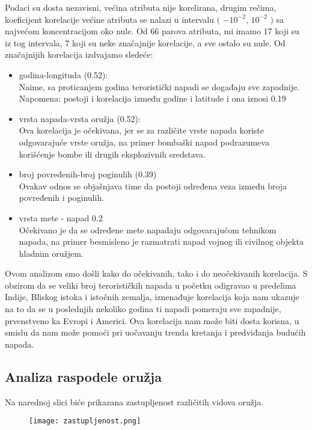 \documentclass[a4paper]{article}
\begin{document}
Podaci su dosta nezavisni, većina atributa nije korelirana, drugim rečima, koeficijent korelacije većine atributa se nalazi u intervalu $($ $-10^{-2}$, $10^{-2}$ $)$ sa najvećom koncentracijom oko nule. Od 66 parova atributa, mi imamo 17 koji su iz tog intervala, 7 koji su neke značajnije korelacije, a sve ostalo su nule. Od značajnijih korelacija izdvajamo sledeće: 
\begin{itemize} 
	\item godina-longituda (0.52): \\ Naime, sa proticanjem godina teroristički napadi se događaju sve zapadnije.\\ Napomena: postoji i korelacija između godine i latitude i ona iznosi 0.19 
	\item vrsta napada-vrsta oružja (0.52): \\ Ova korelacija je očekivana, jer se za različite vrste napada koriste odgovarajuće vrste oružja, na primer bombaški napad podrazumeva korišćenje bombe ili drugih eksplozivnih sredstava. 
	\item broj povređenih-broj poginulih (0.39) \\ Ovakav odnos se objašnjava time da postoji određena veza između broja povređenih i poginulih. 
	\item vrsta mete - napad 0.2 \\ Očekivano je da se određene mete napadaju odgovarajućom tehnikom napada, na primer besmisleno je razmatrati napad vojnog ili civilnog objekta hladnim oružjem.\\ 
\end{itemize}

Ovom analizom smo došli kako do očekivanih, tako i do neočekivanih korelacija. S obzirom da se veliki broj terorističkih napada u početku odigravao u predelima Indije, Bliskog istoka i istočnih zemalja, iznenađuje korelacija koja nam ukazuje na to da se u poslednjih nekoliko godina ti napadi pomeraju sve zapadnije, prvenstveno ka Evropi i Americi. Ova korelacija nam može biti dosta korisna, u smislu da nam može pomoći pri uočavanju trenda kretanja i predviđanja budućih napada.

\subsection{Analiza raspodele oružja}

Na narednoj slici biće prikazana zastupljenost različitih vidova oružja.
\begin{figure}[h!]
\texttt{[image: zastupljenost.png]}
\centering
\end{figure} 
\end{document}
